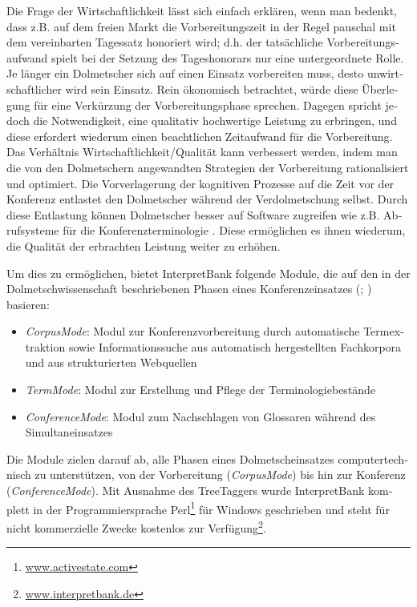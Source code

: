 \documentclass[output=paper]{LSP/langsci}
\begin{document}
\begin{otherlanguage}{ngerman}
Die Frage der Wirtschaftlichkeit lässt sich einfach erklären, wenn man bedenkt, dass z.B. auf dem freien Markt die Vorbereitungszeit in der Regel pauschal mit dem vereinbarten Tagessatz honoriert wird; d.h. der tatsächliche Vorbereitungsaufwand spielt bei der Setzung des Tageshonorars nur eine untergeordnete Rolle. Je länger ein Dolmetscher sich auf einen Einsatz vorbereiten muss, desto unwirtschaftlicher wird sein Einsatz. Rein ökonomisch betrachtet, würde diese Überlegung für eine Verkürzung der Vorbereitungsphase sprechen. Dagegen spricht jedoch die Notwendigkeit, eine qualitativ hochwertige Leistung zu erbringen, und diese erfordert wiederum einen beachtlichen Zeitaufwand für die Vorbereitung. Das Verhältnis Wirtschaftlichkeit/Qualität kann verbessert werden, indem man die von den Dolmetschern angewandten Strategien der Vorbereitung rationalisiert und optimiert. Die Vorverlagerung der kognitiven Prozesse auf die Zeit vor der Konferenz entlastet den Dolmetscher während der Verdolmetschung selbst. Durch diese Entlastung können Dolmetscher besser auf Software zugreifen wie z.B. Abrufsysteme für die Konferenzterminologie \citep{Stoll2002}. Diese ermöglichen es ihnen wiederum, die Qualität der erbrachten Leistung weiter zu erhöhen.

Um dies zu ermöglichen, bietet InterpretBank folgende Module, die auf den in der Dolmetschwissenschaft beschriebenen Phasen eines Konferenzeinsatzes (\citealt[778]{Kalina2005}; \citealt[52ff]{Will2009}) basieren:

\begin{itemize}
\item 
\textit{CorpusMode}: Modul zur Konferenzvorbereitung durch automatische Termextraktion sowie Informationssuche aus automatisch hergestellten Fachkorpora und aus strukturierten Webquellen 
\item 
\textit{TermMode}: Modul zur Erstellung und Pflege der Terminologiebestände
\item 
\textit{ConferenceMode}: Modul zum Nachschlagen von Glossaren während des Simultaneinsatzes
\end{itemize}

Die Module zielen darauf ab, alle Phasen eines Dolmetscheinsatzes computertechnisch zu unterstützen, von der Vorbereitung (\textit{CorpusMode}) bis hin zur Konferenz (\textit{ConferenceMode}). Mit Ausnahme des TreeTaggers wurde InterpretBank komplett in der Programmiersprache Perl\footnote{\url{www.activestate.com}} für Windows geschrieben und steht für nicht kommerzielle Zwecke kostenlos zur Verfügung\footnote{\url{ www.interpretbank.de}}.


\end{otherlanguage}
\end{document}
